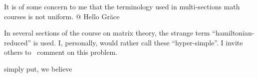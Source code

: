 \documentclass{sample}
\begin{document}
It is of some concern to me     that
the terminology used in multi-sections
math courses is not uniform.
@
Hello Gr\"{a}ce

 In several sections of the course on
 matrix theory, the strange term
    ``hamiltonian-reduced'' is used.
    I, personally, would rather call these
   ``hyper-simple''. I invite others
to \ comment on this problem.

simply put, we believe %
   
\end{document}
